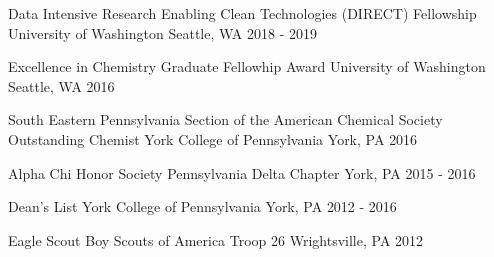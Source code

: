 



\begin{cvhonors}

  \cvhonor
    {Data Intensive Research Enabling Clean Technologies (DIRECT) Fellowship} %
    {University of Washington} %
    {Seattle, WA} %
    {2018 - 2019} %


  \cvhonor
    {Excellence in Chemistry Graduate Fellowhip Award} %
    {University of Washington} %
    {Seattle, WA} %
    {2016} %


  \cvhonor
    {South Eastern Pennsylvania Section of the American Chemical Society Outstanding Chemist} %
    {York College of Pennsylvania} %
    {York, PA} %
    {2016} %


  \cvhonor
    {Alpha Chi Honor Society} %
    {Pennsylvania Delta Chapter} %
    {York, PA} %
    {2015 - 2016} %


  \cvhonor
    {Dean's List} %
    {York College of Pennsylvania} %
    {York, PA} %
    {2012 - 2016} %


  \cvhonor
    {Eagle Scout} %
    {Boy Scouts of America Troop 26} %
    {Wrightsville, PA} %
    {2012} %

\end{cvhonors}
